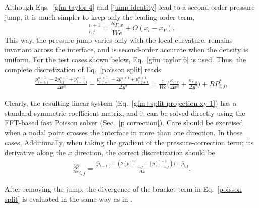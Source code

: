 Although Eqs.\ \eqref{gfm taylor 4} and \eqref{jump identity} lead to a second-order pressure jump, it is much simpler to keep only the leading-order term, \ie
\begin{equation}
    [p]^{n+1}_{i,j} =  \frac{\kappa_{\Gamma,x}}{We} + O(x_{i}- x_\Gamma).
  \label{gfm taylor 6}
\end{equation}
This way, the pressure jump varies only with the local curvature, remains invariant across the interface, and is second-order accurate when the density is uniform. For the test cases shown below, Eq.\ \eqref{gfm taylor 6} is used. Thus, the complete discretization of Eq.\ \eqref{poisson split} reads
\begin{equation}
  \begin{aligned}
    \frac{p^{n+1}_{i-1,j}-2p^{n+1}_{i,j}+p^{n+1}_{i+1,j} }{\Delta x^2} + \frac{p^{n+1}_{i,j-1}-2p^{n+1}_{i,j}+p^{n+1}_{i,j+1} }{\Delta y^2} = 
    \frac{1}{We} \bigg( \frac{\kappa_{\Gamma,x}}{\Delta x^2}+\frac{\kappa_{\Gamma,y}}{\Delta y^2} \bigg)
    + RP_{i,j}^*,
  \end{aligned}
  \label{gfm+split projection xy 1}
\end{equation}

Clearly, the resulting linear system (Eq.\ \eqref{gfm+split projection xy 1}) has a standard  symmetric coefficient matrix, and it can be solved directly using the FFT-based fast Poisson solver (Sec.\ \ref{p correction}). Care should be exercised when a nodal point crosses the interface in more than one direction. In those cases,  Additionally, when taking the gradient of the pressure-correction term; \eg its derivative along the $x$ direction, the correct discretization should be
\begin{equation}
  \begin{aligned}
    \frac{\partial \hat{p}}{\partial x}_{i,j} = 
    \frac{\big(\hat{p}_{i+1,j}-(2[p]^{n}_{i+1,j}-[p]^{n-1}_{i+1,j}) \big) - \hat{p}_{i,j}}{\Delta x}. 
  \end{aligned}
  \label{gfm grad}
\end{equation}

\noindent After removing the jump, the divergence of the bracket term in Eq.\ \eqref{poisson split} is evaluated in the same way as in \cite{Dodd_JCP_2014}.

